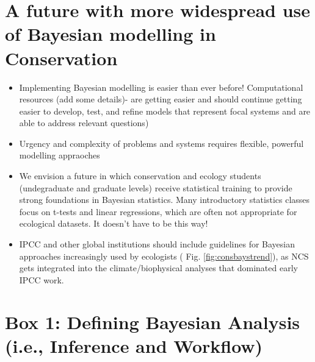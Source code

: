 \documentclass{article}
\begin{document}
\section* {A future with more widespread use of Bayesian modelling in Conservation}
\begin{itemize}
\item Implementing Bayesian modelling is easier than ever before! Computational resources (add some details)- are getting easier and should continue getting easier to develop, test, and refine models that represent focal systems and are able to address relevant questions)
\item Urgency and complexity of problems and systems requires flexible, powerful modelling appraoches 
\item We envision a future in which conservation and ecology students (undegraduate and graduate levels) receive statistical training to provide strong foundations in Bayesian statistics. Many introductory statistics classes focus on t-tests and linear regressions, which are often not appropriate for ecological datasets. It doesn't have to be this way! 
\item IPCC and other global institutions should include guidelines for Bayesian approaches increasingly used by ecologists ( Fig. \ref{fig:consbaystrend}), as NCS gets integrated into the climate/biophysical analyses that dominated early IPCC work.
\end{itemize}

\par 
\section* {Box 1: Defining Bayesian Analysis (i.e., Inference and Workflow)}
\end{document}
